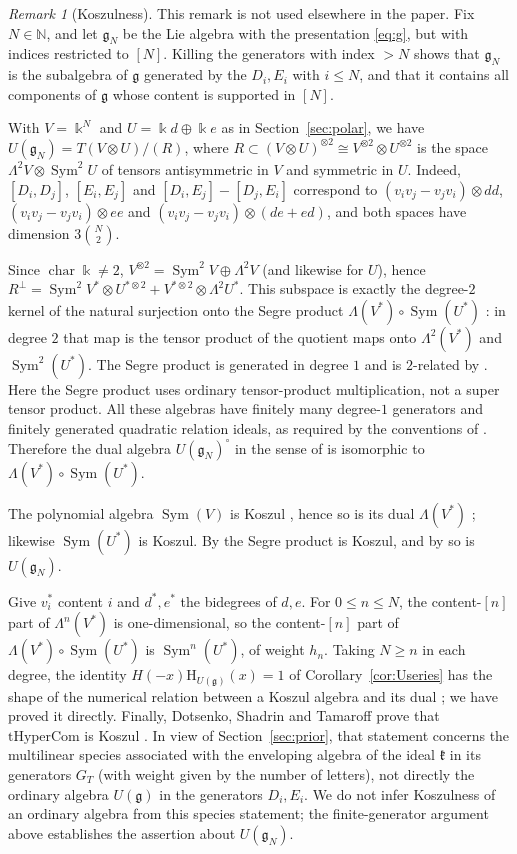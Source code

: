 \documentclass[11pt]{amsart}
\theoremstyle{definition}
\theoremstyle{remark}
\newtheorem{remark}[theorem]{Remark}
\newcommand{\N}{\mathbb{N}}
\newcommand{\kk}{\Bbbk}
\newcommand{\g}{\mathfrak{g}}
\newcommand{\kr}{\mathfrak{k}}
\newcommand{\Hs}{\mathrm{H}}
\newcommand{\Sym}{\operatorname{Sym}}
\begin{document}
\begin{remark}[Koszulness]\label{rem:koszul}
This remark is not used elsewhere in the paper. Fix $N\in\N$, and let $\g_N$ be the Lie algebra with the presentation \eqref{eq:g}, but with indices restricted to $[N]$. Killing the generators with index $>N$ shows that $\g_N$ is the subalgebra of $\g$ generated by the $D_i,E_i$ with $i\le N$, and that it contains all components of $\g$ whose content is supported in $[N]$.

With $V=\kk^N$ and $U=\kk d\oplus\kk e$ as in Section~\ref{sec:polar}, we have $U(\g_N)=T(V\otimes U)/(R)$, where $R\subset(V\otimes U)^{\otimes2}\cong V^{\otimes2}\otimes U^{\otimes2}$ is the space $\Lambda^2V\otimes\Sym^2U$ of tensors antisymmetric in $V$ and symmetric in $U$. Indeed, $[D_i,D_j]$, $[E_i,E_j]$ and $[D_i,E_j]-[D_j,E_i]$ correspond to $(v_iv_j-v_jv_i)\otimes dd$, $(v_iv_j-v_jv_i)\otimes ee$ and $(v_iv_j-v_jv_i)\otimes(de+ed)$, and both spaces have dimension $3\binom N2$.

Since $\operatorname{char}\kk\ne2$, $V^{\otimes2}=\Sym^2V\oplus\Lambda^2V$ (and likewise for $U$), hence $R^\perp=\Sym^2V^*\otimes U^{*\otimes2}+V^{*\otimes2}\otimes\Lambda^2U^*$. This subspace is exactly the degree-$2$ kernel of the natural surjection onto the Segre product $\Lambda(V^*)\circ\Sym(U^*)$ \cite[1.2]{BF}: in degree $2$ that map is the tensor product of the quotient maps onto $\Lambda^2(V^*)$ and $\Sym^2(U^*)$. The Segre product is generated in degree $1$ and is $2$-related by \cite[Prop.~3(b)]{BF}. Here the Segre product uses ordinary tensor-product multiplication, not a super tensor product. All these algebras have finitely many degree-$1$ generators and finitely generated quadratic relation ideals, as required by the conventions of \cite[\S1]{BF}. Therefore the dual algebra $U(\g_N)^\circ$ in the sense of \cite[1.14]{BF} is isomorphic to $\Lambda(V^*)\circ\Sym(U^*)$.

The polynomial algebra $\Sym(V)$ is Koszul \cite[1.17(b)]{BF}, hence so is its dual $\Lambda(V^*)$ \cite[1.16(10)]{BF}; likewise $\Sym(U^*)$ is Koszul. By \cite[Theorem~4(b)]{BF} the Segre product is Koszul, and by \cite[1.16(10)]{BF} so is $U(\g_N)$.

Give $v_i^*$ content $i$ and $d^*,e^*$ the bidegrees of $d,e$. For $0\le n\le N$, the content-$[n]$ part of $\Lambda^n(V^*)$ is one-dimensional, so the content-$[n]$ part of $\Lambda(V^*)\circ\Sym(U^*)$ is $\Sym^n(U^*)$, of weight $h_n$. Taking $N\ge n$ in each degree, the identity $H(-x)\Hs_{U(\g)}(x)=1$ of Corollary~\ref{cor:Useries} has the shape of the numerical relation between a Koszul algebra and its dual \cite[1.16(5)]{BF}; we have proved it directly. Finally, Dotsenko, Shadrin and Tamaroff prove that $\mathrm{tHyperCom}$ is Koszul \cite[Prop.~2.4.3]{DST}. In view of Section~\ref{sec:prior}, that statement concerns the multilinear species associated with the enveloping algebra of the ideal $\kr$ in its generators $G_T$ (with weight given by the number of letters), not directly the ordinary algebra $U(\g)$ in the generators $D_i,E_i$. We do not infer Koszulness of an ordinary algebra from this species statement; the finite-generator argument above establishes the assertion about $U(\g_N)$.
\end{remark}
\end{document}
